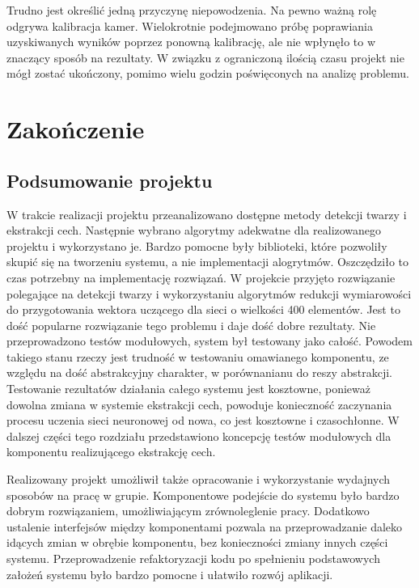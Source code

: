 \documentclass[oneside, eng]{mgr}
\begin{document}
Trudno jest określić jedną przyczynę niepowodzenia. Na pewno ważną rolę odgrywa kalibracja kamer. Wielokrotnie podejmowano próbę poprawiania uzyskiwanych wyników poprzez ponowną kalibrację, ale nie wpłynęło to w znaczący sposób na rezultaty. W związku z ograniczoną ilością czasu projekt nie mógł zostać ukończony, pomimo wielu godzin poświęconych na analizę problemu.



\chapter{Zakończenie}

\section{Podsumowanie projektu}

W trakcie realizacji projektu przeanalizowano dostępne metody detekcji twarzy i ekstrakcji cech. Następnie wybrano algorytmy adekwatne dla realizowanego projektu i wykorzystano je. Bardzo pomocne były biblioteki, które pozwoliły skupić się na tworzeniu systemu, a nie implementacji alogrytmów. Oszczędziło to czas potrzebny na implementację rozwiązań. W projekcie przyjęto rozwiązanie polegające na detekcji twarzy i wykorzystaniu algorytmów redukcji wymiarowości do przygotowania wektora uczącego dla sieci o wielkości 400 elementów. Jest to dość popularne rozwiązanie tego problemu i daje dość dobre rezultaty. Nie przeprowadzono testów modułowych, system był testowany jako całość. Powodem takiego stanu rzeczy jest trudność w testowaniu omawianego komponentu, ze względu na dość abstrakcyjny charakter, w porównanianu do reszy abstrakcji. Testowanie rezultatów działania całego systemu jest kosztowne, ponieważ dowolna zmiana w systemie ekstrakcji cech, powoduje konieczność zaczynania procesu uczenia sieci neuronowej od nowa, co jest kosztowne i czasochłonne. W dalszej części tego rozdziału przedstawiono koncepcję testów modułowych dla komponentu realizującego ekstrakcję cech.

Realizowany projekt umożliwił także opracowanie i wykorzystanie wydajnych sposobów na pracę w grupie. Komponentowe podejście do systemu było bardzo dobrym rozwiązaniem, umożliwiającym zrównoleglenie pracy. Dodatkowo ustalenie interfejsów między komponentami pozwala na przeprowadzanie daleko idących zmian w obrębie komponentu, bez konieczności zmiany innych części systemu. Przeprowadzenie refaktoryzacji kodu po spełnieniu podstawowych założeń systemu było bardzo pomocne i ułatwiło rozwój aplikacji.
\end{document}
